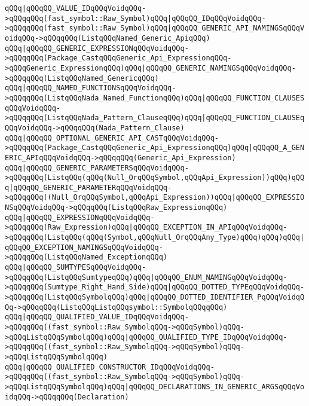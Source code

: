 \verb|qQQq|\verb#|qQQqQQ_VALUE_IDqQQqVoidqQQq->qQQqqQQq(fast_symbol::Raw_Symbol)qQQq|qQQqQQ_IDqQQqVoidqQQq->qQQqqQQq(fast_symbol::Raw_Symbol)qQQq|qQQqQQ_GENERIC_API_NAMINGSqQQqVoidqQQq->qQQqqQQq(ListqQQqNamed_Generic_ApiqQQq)#\newline
\verb|qQQq|\verb#|qQQqQQ_GENERIC_EXPRESSIONqQQqVoidqQQq->qQQqqQQq(Package_CastqQQqGeneric_Api_ExpressionqQQq->qQQqGeneric_ExpressionqQQq)qQQq|qQQqQQ_GENERIC_NAMINGSqQQqVoidqQQq->qQQqqQQq(ListqQQqNamed_GenericqQQq)#\newline
\verb|qQQq|\verb#|qQQqQQ_NAMED_FUNCTIONSqQQqVoidqQQq->qQQqqQQq(ListqQQqNada_Named_FunctionqQQq)qQQq|qQQqQQ_FUNCTION_CLAUSESqQQqVoidqQQq->qQQqqQQq(ListqQQqNada_Pattern_ClauseqQQq)qQQq|qQQqQQ_FUNCTION_CLAUSEqQQqVoidqQQq->qQQqqQQq(Nada_Pattern_Clause)#\newline
\verb|qQQq|\verb#|qQQqQQ_OPTIONAL_GENERIC_API_CASTqQQqVoidqQQq->qQQqqQQq(Package_CastqQQqGeneric_Api_ExpressionqQQq)qQQq|qQQqQQ_A_GENERIC_APIqQQqVoidqQQq->qQQqqQQq(Generic_Api_Expression)#\newline
\verb|qQQq|\verb#|qQQqQQ_GENERIC_PARAMETERSqQQqVoidqQQq->qQQqqQQq(ListqQQq(qQQq(Null_OrqQQqSymbol,qQQqApi_Expression))qQQq)qQQq|qQQqQQ_GENERIC_PARAMETERqQQqVoidqQQq->qQQqqQQq((Null_OrqQQqSymbol,qQQqApi_Expression))qQQq|qQQqQQ_EXPRESSIONSqQQqVoidqQQq->qQQqqQQq(ListqQQqRaw_ExpressionqQQq)#\newline
\verb|qQQq|\verb#|qQQqQQ_EXPRESSIONqQQqVoidqQQq->qQQqqQQq(Raw_Expression)qQQq|qQQqQQ_EXCEPTION_IN_APIqQQqVoidqQQq->qQQqqQQq(ListqQQq(qQQq(Symbol,qQQqNull_OrqQQqAny_Type)qQQq)qQQq)qQQq|qQQqQQ_EXCEPTION_NAMINGSqQQqVoidqQQq->qQQqqQQq(ListqQQqNamed_ExceptionqQQq)#\newline
\verb|qQQq|\verb#|qQQqQQ_SUMTYPESqQQqVoidqQQq->qQQqqQQq(ListqQQqSumtypeqQQq)qQQq|qQQqQQ_ENUM_NAMINGqQQqVoidqQQq->qQQqqQQq(Sumtype_Right_Hand_Side)qQQq|qQQqQQ_DOTTED_TYPEqQQqVoidqQQq->qQQqqQQq(ListqQQqSymbolqQQq)qQQq|qQQqQQ_DOTTED_IDENTIFIER_PqQQqVoidqQQq->qQQqqQQq(ListqQQqListqQQqsymbol::SymbolqQQqqQQq)#\newline
\verb|qQQq|\verb#|qQQqQQ_QUALIFIED_VALUE_IDqQQqVoidqQQq->qQQqqQQq((fast_symbol::Raw_SymbolqQQq->qQQqSymbol)qQQq->qQQqListqQQqSymbolqQQq)qQQq|qQQqQQ_QUALIFIED_TYPE_IDqQQqVoidqQQq->qQQqqQQq((fast_symbol::Raw_SymbolqQQq->qQQqSymbol)qQQq->qQQqListqQQqSymbolqQQq)#\newline
\verb|qQQq|\verb#|qQQqQQ_QUALIFIED_CONSTRUCTOR_IDqQQqVoidqQQq->qQQqqQQq((fast_symbol::Raw_SymbolqQQq->qQQqSymbol)qQQq->qQQqListqQQqSymbolqQQq)qQQq|qQQqQQ_DECLARATIONS_IN_GENERIC_ARGSqQQqVoidqQQq->qQQqqQQq(Declaration)#\newline
